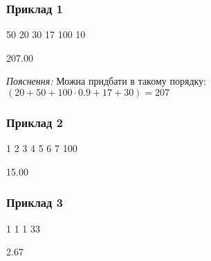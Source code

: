 \documentclass[12pt,a4paper]{article}
\begin{document}
\pagebreak


\subsubsection*{Приклад 1}

\textbf{}

\begin{codeblock}
50 20 30 17 100
10
\end{codeblock}

\textbf{}

\begin{codeblock}
207.00
\end{codeblock}
\emph{Пояснення:} Можна придбати в такому порядку: \((20 + 50 + 100\cdot0.9 + 17 + 30) = 207\)


\subsubsection*{Приклад 2}

\textbf{}

\begin{codeblock}
1 2 3 4 5 6 7
100
\end{codeblock}

\textbf{}

\begin{codeblock}
15.00
\end{codeblock}


\subsubsection*{Приклад 3}

\textbf{}

\begin{codeblock}
1 1 1
33
\end{codeblock}

\textbf{}

\begin{codeblock}
2.67
\end{codeblock}
\end{document}
